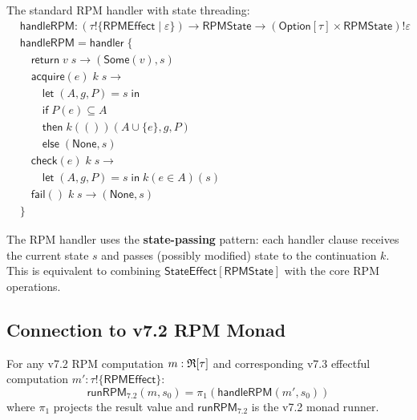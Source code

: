 \begin{definition}
\label{def:rpm-handler}
The standard RPM handler with state threading:
\begin{align}
&\mathsf{handleRPM} : (\tau \mathbin{!} \{\mathsf{RPMEffect} \mid \varepsilon\}) \to \mathsf{RPMState} \to (\mathsf{Option}[\tau] \times \mathsf{RPMState}) \mathbin{!} \varepsilon \\[2ex]
&\mathsf{handleRPM} = \mathsf{handler}\; \{ \\
&\quad \mathsf{return}\; v\; s \to (\mathsf{Some}(v), s) \\[1ex]
&\quad \mathsf{acquire}(e)\; k\; s \to \\
&\qquad \mathsf{let}\; (A, g, P) = s\; \mathsf{in} \\
&\qquad \mathsf{if}\; P(e) \subseteq A \\
&\qquad \mathsf{then}\; k(())(A \cup \{e\}, g, P) \\
&\qquad \mathsf{else}\; (\mathsf{None}, s) \\[1ex]
&\quad \mathsf{check}(e)\; k\; s \to \\
&\qquad \mathsf{let}\; (A, g, P) = s\; \mathsf{in}\; k(e \in A)(s) \\[1ex]
&\quad \mathsf{fail}()\; k\; s \to (\mathsf{None}, s) \\
&\}
\end{align}
\end{definition}

\begin{remark}
\label{rem:state-threading}
The RPM handler uses the \textbf{state-passing} pattern: each handler clause receives the current state $s$ and passes (possibly modified) state to the continuation $k$. This is equivalent to combining $\mathsf{StateEffect}[\mathsf{RPMState}]$ with the core RPM operations.
\end{remark}

\subsection{Connection to v7.2 RPM Monad}
\label{subsec:rpm-v72-connection}

\begin{theorem}
\label{thm:rpm-handler-equiv}
For any v7.2 RPM computation $m : \mathfrak{R}[\tau]$ and corresponding v7.3 effectful computation $m' : \tau \mathbin{!} \{\mathsf{RPMEffect}\}$:
\[
\mathsf{runRPM}_{7.2}(m, s_0) = \pi_1(\mathsf{handleRPM}(m', s_0))
\]
where $\pi_1$ projects the result value and $\mathsf{runRPM}_{7.2}$ is the v7.2 monad runner.
\end{theorem}

